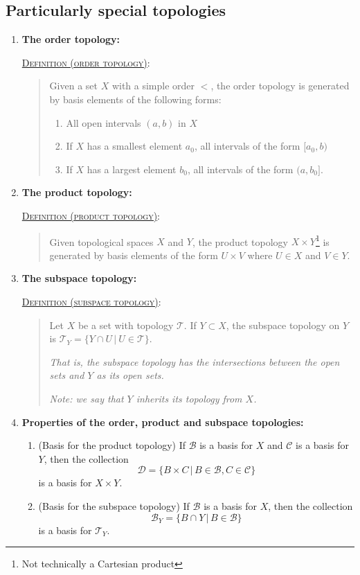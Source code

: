 \documentclass[letterpaper, 12pt]{article}
\newcommand{\ms}[1]{\mathscr{#1}}
\newcommand{\defn}[2]{\textsc{\underline{Definition (#1)}:}\begin{quote} #2\end{quote}}
\begin{document}
    \subsection{Particularly special topologies}
        \begin{enumerate}[resume]
        \item \textbf{The order topology:}

        \defn{order topology}{Given a set $X$ with a simple order $<$, the order topology is generated by basis elements of the following forms:
        \begin{enumerate}
        \item All open intervals $(a, b)$ in $X$
        \item If $X$ has a smallest element $a_0$, all intervals of the form $[a_0, b)$
        \item If $X$ has a largest element $b_0$, all intervals of the form $(a, b_0]$.
        \end{enumerate}
        }
        \item \textbf{The product topology:}

        \defn{product topology}{Given topological spaces $X$ and $Y$, the product topology $X\times Y$\footnote{Not technically a Cartesian product} is generated by basis elements of the form $U\times V$ where $U\in X$ and $V\in Y$.}
        \item \textbf{The subspace topology:}

        \defn{subspace topology}{Let $X$ be a set with topology $\ms{T}$. If $Y\subset X$, the subspace topology on $Y$ is $\ms{T}_Y = \{Y\cap U\,|\ U\in\ms{T}\}$.

        \textit{That is, the subspace topology has the intersections between the open sets and $Y$ as its open sets.}

        \textit{Note: we say that $Y$ inherits its topology from $X$.}}
        \item \textbf{Properties of the order, product and subspace topologies:}
        \begin{enumerate}
        \item (Basis for the product topology) If $\ms{B}$ is a basis for $X$ and $\ms{C}$ is a basis for $Y$, then the collection \[\ms{D} = \{B\times C\,|\, B\in\ms{B}, C\in\ms{C}\}\] is a basis for $X\times Y$.
        \item (Basis for the subspace topology) If $\ms{B}$ is a basis for $X$, then the collection \[\ms{B}_Y = \{B \cap Y\,|\, B\in\ms{B}\}\] is a basis for $\ms{T}_Y$.


\end{enumerate}
\end{enumerate}
\end{document}
